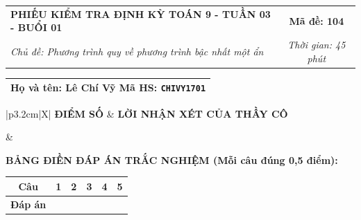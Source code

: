 \documentclass[12pt,a4paper]{article}
\begin{document}
\newpage


\noindent
\begin{tabularx}{\linewidth}{|X|c|}
\hline
\textbf{PHIẾU KIỂM TRA ĐỊNH KỲ TOÁN 9 - TUẦN 03 - BUỔI 01} & \textbf{Mã đề: 104} \\
\textit{Chủ đề: Phương trình quy về phương trình bậc nhất một ẩn} & \textit{Thời gian: 45 phút} \\
\hline
\end{tabularx}

\vspace{1mm}

\noindent
\begin{tabularx}{\linewidth}{|X|}
\hline
\rule[-2mm]{0pt}{7.5mm}\textbf{Họ và tên:} \textbf{\large Lê Chí Vỹ} \hfill \textbf{Mã HS:} \texttt{CHIVY1701} \quad \\
\hline
\end{tabularx}

\vspace{1mm}

\noindent
\begin{tabularx}{\linewidth}{|p{3.2cm}|X|}
\hline
\centering\textbf{ĐIỂM SỐ} & \centering\textbf{LỜI NHẬN XÉT CỦA THẦY CÔ} \tabularnewline
\hline
\rule{0pt}{1.3cm} & \tabularnewline
\hline
\end{tabularx}

\vspace{1.2mm}

\noindent\textbf{BẢNG ĐIỀN ĐÁP ÁN TRẮC NGHIỆM (Mỗi câu đúng 0,5 điểm):}
\vspace{0.8mm}

\noindent
\renewcommand{\arraystretch}{1.35}
\begin{tabularx}{\linewidth}{|c|*{5}{>{\centering\arraybackslash}X|}}
\hline
\textbf{Câu} & \textbf{1} & \textbf{2} & \textbf{3} & \textbf{4} & \textbf{5} \\
\hline
\textbf{Đáp án} & & & & & \\
\hline
\end{tabularx}
\renewcommand{\arraystretch}{1.0}

\vspace{1.5mm}
\end{document}
